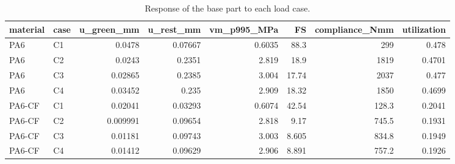 \begin{table}[htbp]
\centering
\caption{Response of the base part to each load case.}
\label{tab:T10_03_base_response}
\begin{tabular}{llrrrrrr}
\toprule
material & case & u\_green\_mm & u\_rest\_mm & vm\_p995\_MPa & FS & compliance\_Nmm & utilization \\
\midrule
PA6 & C1 & 0.0478 & 0.07667 & 0.6035 & 88.3 & 299 & 0.478 \\
PA6 & C2 & 0.0243 & 0.2351 & 2.819 & 18.9 & 1819 & 0.4701 \\
PA6 & C3 & 0.02865 & 0.2385 & 3.004 & 17.74 & 2037 & 0.477 \\
PA6 & C4 & 0.03452 & 0.235 & 2.909 & 18.32 & 1850 & 0.4699 \\
PA6-CF & C1 & 0.02041 & 0.03293 & 0.6074 & 42.54 & 128.3 & 0.2041 \\
PA6-CF & C2 & 0.009991 & 0.09654 & 2.818 & 9.17 & 745.5 & 0.1931 \\
PA6-CF & C3 & 0.01181 & 0.09743 & 3.003 & 8.605 & 834.8 & 0.1949 \\
PA6-CF & C4 & 0.01412 & 0.09629 & 2.906 & 8.891 & 757.2 & 0.1926 \\
\bottomrule
\end{tabular}
\end{table}
